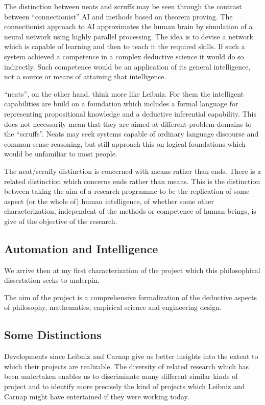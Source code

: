 The distinction between neats and scruffs may be seen through the
contrast between ``connectionist'' AI and methods based on theorem proving.
The connectionist approach to AI approximates the human brain by
simulation of a neural network using highly parallel processing.
The idea is to devise a network which is capable of learning and then
to teach it the required skills.
If such a system achieved a competence in a complex deductive science
it would do so indirectly.
Such competence would be an application of its general intelligence,
not a source or means of attaining that intelligence.

``neats'', on the other hand, think more like Leibniz.
For them the intelligent capabilities are build on a foundation which
includes a formal language for representing propositional knowledge
and a deductive inferential capability.
This does not necessarily mean that they are aimed at different
problem domains to the ``scruffs''.
Neats may seek systems capable of ordinary language discourse and
common sense reasoning, but still approach this on logical foundations
which would be unfamiliar to most people.

The neat/scruffy distinction is concerned with means rather than ends.
There is a related distinction which concerns ends rather than means.
This is the distinction between taking the aim of a research programme
to be the replication of some aspect (or the whole of) human
intelligence, of whether some other characterization, independent of
the methods or competence of human beings, is give of the objective of
the research.

\subsection{Automation and Intelligence}\label{AutomationAndIntelligence}

We arrive then at my first characterization of the project which this
philosophical dissertation seeks to underpin.

The aim of the project is a comprehensive formalization of the
deductive aspects of philosophy, mathematics, empirical science and
engineering design.

\subsection{Some Distinctions}

Developments since Leibniz and Carnap give us better insights into
the extent to which their projects are realizable.
The diversity of related research which has been undertaken enables us
to discriminate many different similar kinds of project and to
identify more precisely the kind of projects which Leibniz and Carnap
might have entertained if they were working today.


